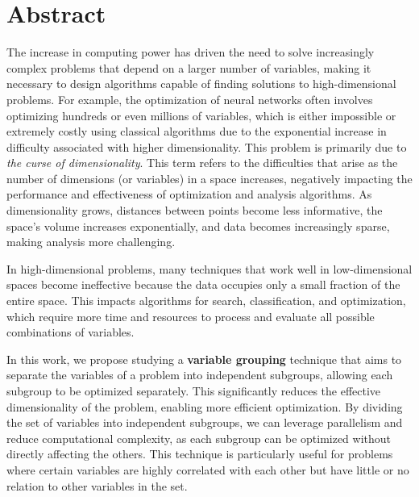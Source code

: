 %

\chapter{Abstract}

\indent The increase in computing power has driven the need to solve increasingly complex problems that depend on a larger number of variables, making it necessary to design algorithms capable of finding solutions to high-dimensional problems. For example, the optimization of neural networks often involves optimizing hundreds or even millions of variables, which is either impossible or extremely costly using classical algorithms due to the exponential increase in difficulty associated with higher dimensionality. This problem is primarily due to \textit{the curse of dimensionality}. This term refers to the difficulties that arise as the number of dimensions (or variables) in a space increases, negatively impacting the performance and effectiveness of optimization and analysis algorithms. As dimensionality grows, distances between points become less informative, the space's volume increases exponentially, and data becomes increasingly sparse, making analysis more challenging.

In high-dimensional problems, many techniques that work well in low-dimensional spaces become ineffective because the data occupies only a small fraction of the entire space. This impacts algorithms for search, classification, and optimization, which require more time and resources to process and evaluate all possible combinations of variables.

In this work, we propose studying a \textbf{variable grouping} technique that aims to separate the variables of a problem into independent subgroups, allowing each subgroup to be optimized separately. This significantly reduces the effective dimensionality of the problem, enabling more efficient optimization. By dividing the set of variables into independent subgroups, we can leverage parallelism and reduce computational complexity, as each subgroup can be optimized without directly affecting the others. This technique is particularly useful for problems where certain variables are highly correlated with each other but have little or no relation to other variables in the set.

